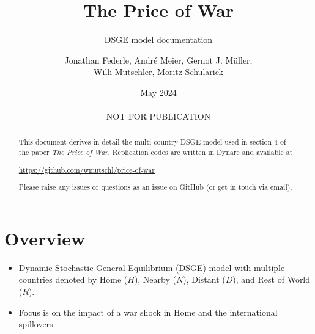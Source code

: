 

\renewcommand{\currencyParadigm}{PCP}



\title{The Price of War}
\subtitle{DSGE model documentation}
\author{Jonathan Federle, 
André Meier,
Gernot J. Müller,\\
Willi Mutschler,
Moritz Schularick}
\date{May 2024\\~\\NOT FOR PUBLICATION}

\maketitle%
\begin{abstract}
\noindent
This document derives in detail the multi-country DSGE model used in section 4 of the paper \emph{The Price of War}.
Replication codes are written in Dynare and available at
\begin{center}\url{https://github.com/wmutschl/price-of-war}\end{center}
Please raise any issues or questions as an issue on GitHub (or get in touch via email).
\end{abstract}

\newpage
\tableofcontents
\newpage

\section{Overview}
\begin{itemize}[itemsep=0pt, topsep=0pt, partopsep=0pt, parsep=0pt]
\item Dynamic Stochastic General Equilibrium (DSGE) model with multiple countries denoted by Home (\(H\)), Nearby (\(N\)), Distant (\(D\)),
  and Rest of World (\(R\)).
\item Focus is on the impact of a war shock in Home and the international spillovers.
\end{itemize}

